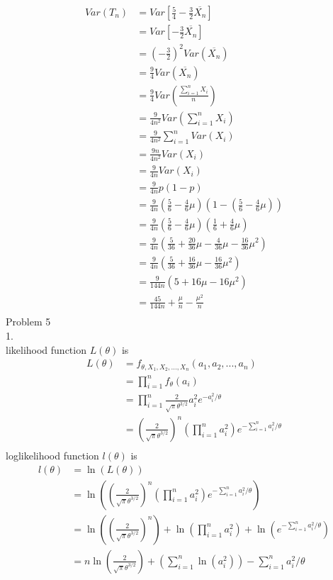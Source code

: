 \documentclass[12pt,border=4pt,multi]{article} %
\begin{document}
\begin{align*}
Var(T_n) &= Var\left[\frac{5}{4} - \frac{3}{2}\overline{X_n}\right]\\
&= Var\left[-\frac{3}{2}\overline{X_n}\right]\\
&= \left(-\frac{3}{2}\right)^2 Var(\overline{X_n})\\
&= \frac{9}{4}Var(\overline{X_n})\\
&= \frac{9}{4}Var\left(\frac{\sum_{i = 1}^n X_i}{n}\right)\\
&= \frac{9}{4n^2}Var(\sum_{i = 1}^n X_i)\\
&= \frac{9}{4n^2}\sum_{i = 1}^n Var(X_i)\\
&= \frac{9n}{4n^2} Var(X_i)\\
&= \frac{9}{4n} Var(X_i)\\
&= \frac{9}{4n} p(1 - p)\\
&= \frac{9}{4n} (\frac{5}{6} - \frac{4}{6}\mu)(1 - (\frac{5}{6} - \frac{4}{6}\mu))\\
&= \frac{9}{4n} (\frac{5}{6} - \frac{4}{6}\mu)(\frac{1}{6} + \frac{4}{6}\mu)\\
&= \frac{9}{4n} (\frac{5}{36} + \frac{20}{36}\mu - \frac{4}{36}\mu - \frac{16}{36}\mu^2)\\
&= \frac{9}{4n} (\frac{5}{36} + \frac{16}{36}\mu - \frac{16}{36}\mu^2)\\
&= \frac{9}{144n} (5 + 16\mu - 16\mu^2)\\
&= \boxed{\frac{45}{144n} + \frac{\mu}{n} - \frac{\mu^2}{n}}\\
\end{align*}
\newpage
\noindent
Problem 5\\
1.\\
likelihood function $L(\theta)$ is
\begin{align*}
L(\theta) &= f_{\theta, X_1, X_2, ..., X_n} (a_1, a_2, ..., a_n)\\
&= \prod_{i = 1}^n f_\theta (a_i)\\
&= \prod_{i = 1}^n \frac{2}{\sqrt{\pi}\theta^{3 / 2}} a_i^2 e^{-a_i^2 / \theta}\\
&= \left(\frac{2}{\sqrt{\pi}\theta^{3 / 2}}\right)^n \left(\prod_{i = 1}^n a_i^2 \right) e^{-\sum_{i = 1}^n a_i^2 / \theta}\\
\end{align*}
loglikelihood function $l(\theta)$ is
\begin{align*}
l(\theta) &= \ln(L(\theta))\\
&= \ln\left(\left(\frac{2}{\sqrt{\pi}\theta^{3 / 2}}\right)^n \left(\prod_{i = 1}^n a_i^2 \right) e^{-\sum_{i = 1}^n a_i^2 / \theta}\right)\\
&= \ln\left(\left(\frac{2}{\sqrt{\pi}\theta^{3 / 2}}\right)^n\right) + \ln\left(\prod_{i = 1}^n a_i^2 \right) + \ln\left(e^{-\sum_{i = 1}^n a_i^2 / \theta}\right)\\
&= n\ln\left(\frac{2}{\sqrt{\pi}\theta^{3 / 2}}\right) + \left(\sum_{i = 1}^n\ln(a_i^2)\right) -\sum_{i = 1}^n a_i^2 / \theta\\
\end{align*}
\end{document}
